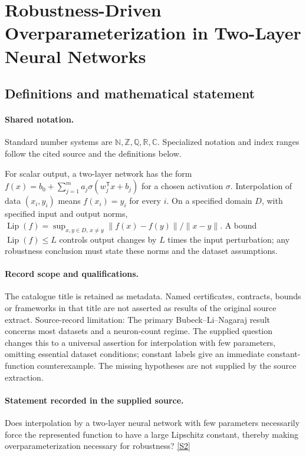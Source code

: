 \documentclass[11pt]{article}
\newcommand{\sref}[2]{\hyperlink{source:#1:#2}{[S#2]}}
\begin{document}
\section{Robustness-Driven Overparameterization in Two-Layer Neural Networks}\label{statement}

\subsection{Definitions and mathematical statement}

\paragraph{Shared notation.}Standard number systems are $\mathbb N,\mathbb Z,\mathbb Q,\mathbb R,\mathbb C$. Specialized notation and index ranges follow the cited source and the definitions below.


For scalar output, a two-layer network has the form $f(x)=b_0+\sum_{j=1}^m a_j\sigma(w_j^{\mathsf T}x+b_j)$ for a chosen activation $\sigma$. Interpolation of data $(x_i,y_i)$ means $f(x_i)=y_i$ for every $i$. On a specified domain $D$, with specified input and output norms, $\operatorname{Lip}(f)=\sup_{x,y\in D,\,x\ne y}\|f(x)-f(y)\|/\|x-y\|$. A bound $\operatorname{Lip}(f)\le L$ controls output changes by $L$ times the input perturbation; any robustness conclusion must state these norms and the dataset assumptions.
\paragraph{Record scope and qualifications.}
The catalogue title is retained as metadata. Named certificates, contracts, bounds or frameworks in that title are not asserted as results of the original source extract.
Source-record limitation: The primary Bubeck--Li--Nagaraj result concerns most datasets and a neuron-count regime. The supplied question changes this to a universal assertion for interpolation with few parameters, omitting essential dataset conditions; constant labels give an immediate constant-function counterexample. The missing hypotheses are not supplied by the source extraction.
\paragraph{Statement recorded in the supplied source.}
Does interpolation by a two-layer neural network with few parameters necessarily force the represented function to have a large Lipschitz constant, thereby making overparameterization necessary for robustness? \sref{statement}{2}
\end{document}
